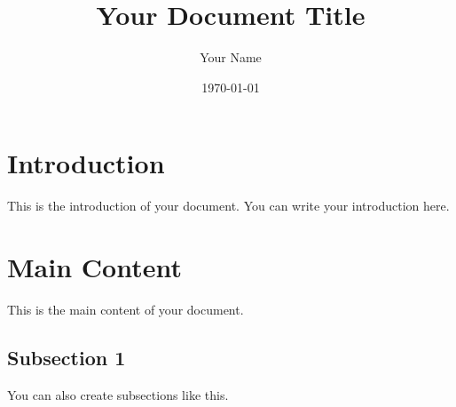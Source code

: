 \geometry{margin=1in}  %

\title{Your Document Title}  %
\author{Your Name}  %
\date{\today}  %



\maketitle  %

\tableofcontents  %

\section{Introduction}  %
This is the introduction of your document. You can write your introduction here.

\section{Main Content}  %
This is the main content of your document. 

\subsection{Subsection 1}  %
You can also create subsections like this.